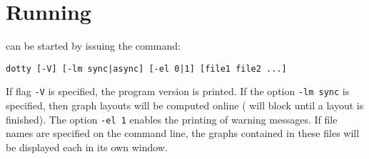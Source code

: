 \chapter{Running {\DOTTY}}
\label{apprunning}
{\DOTTY} can be started by issuing the command:

\begin{verbatim}
dotty [-V] [-lm sync|async] [-el 0|1] [file1 file2 ...]
\end{verbatim}

\noindent
If flag {\tt -V} is specified, the program version is printed.  If the option
{\tt -lm sync} is specified, then graph layouts will be computed online
({\DOTTY} will block until a layout is finished).  The option {\tt -el 1}
enables the printing of warning messages.  If file names are specified on the
command line, the graphs contained in these files will be displayed each in its
own {\DOTTY} window.

